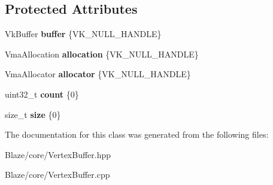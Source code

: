 \subsection*{Protected Attributes}
\begin{DoxyCompactItemize}
\item 
\mbox{\label{classblaze_1_1BaseVBO_a3cbf6177475e40b7d0bf2bc59e3eb43a}} 
Vk\+Buffer {\bfseries buffer} \{V\+K\+\_\+\+N\+U\+L\+L\+\_\+\+H\+A\+N\+D\+LE\}
\item 
\mbox{\label{classblaze_1_1BaseVBO_abf5e6d6f805e6394d2e0904860baba71}} 
Vma\+Allocation {\bfseries allocation} \{V\+K\+\_\+\+N\+U\+L\+L\+\_\+\+H\+A\+N\+D\+LE\}
\item 
\mbox{\label{classblaze_1_1BaseVBO_a37f949fdad807b65931264089540c005}} 
Vma\+Allocator {\bfseries allocator} \{V\+K\+\_\+\+N\+U\+L\+L\+\_\+\+H\+A\+N\+D\+LE\}
\item 
\mbox{\label{classblaze_1_1BaseVBO_aff756843a4b3edeea281d57cf6d148ce}} 
uint32\+\_\+t {\bfseries count} \{0\}
\item 
\mbox{\label{classblaze_1_1BaseVBO_a670e4e4446c2286fac4b922ddb5c84f3}} 
size\+\_\+t {\bfseries size} \{0\}
\end{DoxyCompactItemize}


The documentation for this class was generated from the following files\+:\begin{DoxyCompactItemize}
\item 
Blaze/core/Vertex\+Buffer.\+hpp\item 
Blaze/core/Vertex\+Buffer.\+cpp\end{DoxyCompactItemize}
